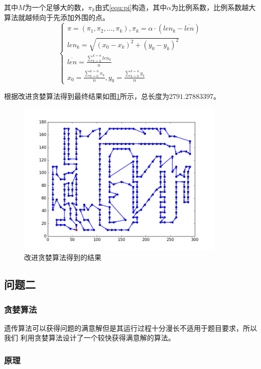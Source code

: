 \documentclass[fontset=windows,a4paper,12pt]{ctexart}
\begin{document}
        其中$M$为一个足够大的数，$\pi_k$由式\ref{equ:pi}构造，其中$\alpha$为比例系数，比例系数越大算法就越倾向于先添加外围的点。
        \begin{equation}
             \left\{
	             \begin{array}{l}
		             \pi=(\pi_1,\pi_2,\dots{,\pi_k}),\pi_k=\alpha\cdot(len_k-\overline{len})\\
		             len_k = \sqrt{(x_0-x_k)^2+(y_0-y_k)^2}\\
		             \overline{len} = \frac{\sum_{k=0}^{k=n}len_k}{n}\\
		             x_0 = \frac{\sum_{k=0}^{k=n}x_k}{n},y_0 = \frac{\sum_{k=0}^{k=n}y_k}{n}
	             \end{array}
             \right.
             \label{equ:pi}
        \end{equation}
 
        根据改进贪婪算法得到最终结果如图\ref{fig:greedy}所示，总长度为$2791.27883397$。
		\begin{figure}[htbp]
			\centering
			\includegraphics[width=10cm]{pic/greedy_result.png}
			\caption{改进贪婪算法得到的结果}
			\label{fig:greedy}
		\end{figure}

    \subsection{问题二}
      \subsubsection{贪婪算法}
        遗传算法可以获得问题的满意解但是其运行过程十分漫长不适用于题目要求，所以我们
        利用贪婪算法设计了一个较快获得满意解的算法。
      \subsubsection{原理}
        
  
  
\end{document}
